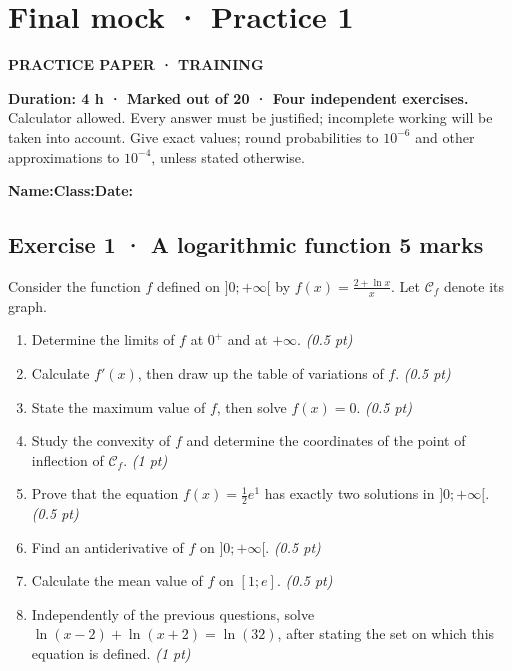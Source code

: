 \clearpage{}\label{sujet:9-1}

\section*{Final mock · Practice 1}

{\sffamily\bfseries\color{teal}PRACTICE PAPER · TRAINING\par}

\textbf{Duration: 4 h · Marked out of 20 · Four independent exercises.}\\Calculator allowed. Every answer must be justified; incomplete working will be taken into account. Give exact values; round probabilities to $10^{-6}$ and other approximations to $10^{-4}$, unless stated otherwise.

\smallskip\textbf{Name:}\enspace\dotfill\quad\textbf{Class:}\enspace\dotfill\quad\textbf{Date:}\enspace\dotfill

\subsection*{Exercise 1 · A logarithmic function \hfill 5 marks}Consider the function $f$ defined on $]0;+\infty[$ by $f(x)=\frac{2+\ln x}x$. Let $\mathcal C_f$ denote its graph.

\begin{enumerate}

\item Determine the limits of $f$ at $0^+$ and at $+\infty$. \hfill\textit{(0.5 pt)}

\item Calculate $f' (x)$, then draw up the table of variations of $f$. \hfill\textit{(0.5 pt)}

\item State the maximum value of $f$, then solve $f(x)=0$. \hfill\textit{(0.5 pt)}

\item Study the convexity of $f$ and determine the coordinates of the point of inflection of $\mathcal C_f$. \hfill\textit{(1 pt)}

\item Prove that the equation $f(x)=\frac12 e^{1}$ has exactly two solutions in $]0;+\infty[$. \hfill\textit{(0.5 pt)}

\item Find an antiderivative of $f$ on $]0;+\infty[$. \hfill\textit{(0.5 pt)}

\item Calculate the mean value of $f$ on $[1;e]$. \hfill\textit{(0.5 pt)}

\item Independently of the previous questions, solve $\ln(x-2)+\ln(x+2)=\ln(32)$, after stating the set on which this equation is defined. \hfill\textit{(1 pt)}

\end{enumerate}

